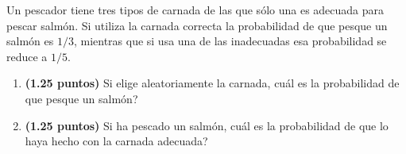 
Un pescador tiene tres tipos de carnada de las que sólo una es adecuada para pescar salmón. Si utiliza la carnada correcta la probabilidad de que pesque un salmón es $1/3$, mientras que si usa una de las inadecuadas esa probabilidad se reduce a $1/5$.
\begin{enumerate}[label=\alph*)]
\item \textbf{(1.25 puntos)} Si elige aleatoriamente la carnada, \textquestiondown{}cuál es la probabilidad de que pesque un salmón?
\item \textbf{(1.25 puntos)} Si ha pescado un salmón, \textquestiondown{}cuál es la probabilidad de que lo haya hecho con la carnada adecuada?
\end{enumerate}
